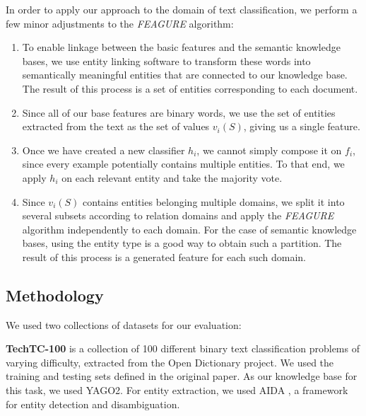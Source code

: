 \documentclass[twoside,11pt]{article}
\theoremstyle{definition}
\begin{document}
In order to apply our approach to the domain of text classification, we perform a few minor adjustments to the \emph{FEAGURE} algorithm:
\begin{enumerate}
	\item To enable linkage between the basic features and the semantic knowledge bases, we use entity linking software  to transform these words into semantically meaningful entities that are connected to our knowledge base. The result of this process is a set of entities corresponding to each document.
	\item Since all of our base features are binary words, we use the set of entities extracted from the text as the set of values $v_i(S)$, giving us a single feature.
	\item Once we have created a new classifier $h_i$, we cannot simply compose it on $f_i$, since every example potentially contains multiple entities. To that end, we apply $h_i$ on each relevant entity and take the majority vote.
	\item Since $v_i(S)$ contains entities belonging multiple domains,  we split it into several subsets according to relation domains and apply the \emph{FEAGURE} algorithm independently to each domain. For the case of semantic knowledge bases, using the entity type is a good way to obtain such a partition. The result of this process is a generated feature for each such domain.
\end{enumerate}

\subsection{Methodology}

We used two collections of datasets for our evaluation:

\textbf{TechTC-100} \cite{gabrilovich2004text} is a collection of 100 different binary text classification problems of varying difficulty, extracted from the Open Dictionary project.
We used the training and testing sets defined in the original paper. 
As our knowledge base for this task, we used YAGO2. %
For entity extraction, we used AIDA \cite{hoffart2011robust}, a framework for entity detection and disambiguation. 

\end{document}
